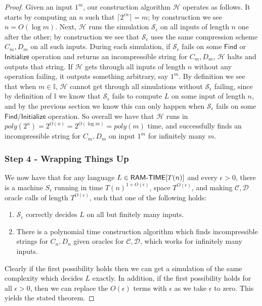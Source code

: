 \begin{proof}
Given an input $1^m$, our construction algorithm $\mathcal{H}$ operates as follows. It starts by computing an $n$ such that $\lceil 2^{\epsilon n} \rceil = m$; by construction we see $n = O(\log m)$. Next, $\mathcal{H}$ runs the simulation $\mathcal{S}_{\epsilon}$ on all inputs of length $n$ one after the other; by construction we see that $\mathcal{S}_{\epsilon}$ uses the same compression scheme $C_m,D_m$ on all such inputs. During each simulation, if $\mathcal{S}_{\epsilon}$ fails on some $\mathsf{Find}$ or $\mathsf{Initialize}$ operation and returns an incompressible string for $C_m,D_m$, $\mathcal{H}$ halts and outputs that string. If $\mathcal{H}$ gets through all inputs of length $n$ without any operation failing, it outputs something arbitrary, say $1^m$. By definition we see that when $m \in \mathbb{I}$, $\mathcal{H}$ cannot get through all simulations without $\mathcal{S}_{\epsilon}$ failing, since by definition of $\mathbb{I}$ we know that $\mathcal{S}_{\epsilon}$ fails to compute $L$ on some input of length $n$, and by the previous section we know this can only happen when $\mathcal{S}_{\epsilon}$ fails on some $\mathsf{Find}$/$\mathsf{Initialize}$ operation. So overall we have that $\mathcal{H}$ runs in $poly(2^n) = 2^{O(n)} = 2^{O(\log m)} = poly(m)$ time, and successfully finds an incompressible string for $C_m,D_m$ on input $1^m$ for infinitely many $m$.

\subsubsection*{Step 4 - Wrapping Things Up}
We now have that for any language $L \in \cl{RAM\dash TIME}[T(n)]$ and every $\epsilon > 0$, there is a machine $S_{\epsilon}$ running in time $T(n)^{1+O(\epsilon)}$, space $T^{O(\epsilon)}$, and making $\mathcal{C},\mathcal{D}$ oracle calls of length $T^{O(\epsilon)}$, such that one of the following holds:
\begin{enumerate}
    \item $\mathcal{S}_{\epsilon}$ correctly decides $L$ on all but finitely many inputs.
    \item There is a polynomial time construction algorithm which finds incompressible strings for $C_n,D_n$ given oracles for $\mathcal{C},\mathcal{D}$, which works for infinitely many inputs.
\end{enumerate}
Clearly if the first possibility  holds then we can get a simulation of the same complexity which decides $L$ exactly. In addition, if the first possibility holds for all $\epsilon > 0$, then we can replace the $O(\epsilon)$ terms with $\epsilon$ as we take $\epsilon$ to zero. This yields the stated theorem.
\end{proof}

